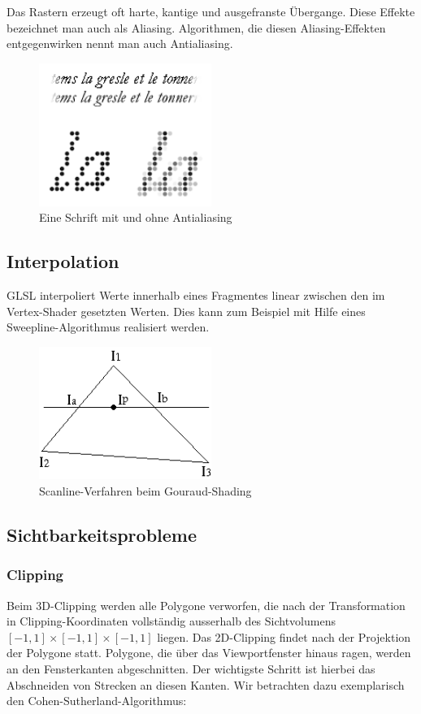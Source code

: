 Das Rastern erzeugt oft harte, kantige und ausgefranste Übergange. Diese Effekte bezeichnet man auch als Aliasing. Algorithmen, die diesen Aliasing-Effekten entgegenwirken nennt man auch Antialiasing. 
\begin{figure}[H]
    \centering
    \includegraphics[width=0.5\textwidth]{images/Antialiasing.png}
    \caption{Eine Schrift mit und ohne Antialiasing}
    \label{fig:screening-antialiasing-font}
\end{figure}

\subsection*{Interpolation}
GLSL interpoliert Werte innerhalb eines Fragmentes linear zwischen den im Vertex-Shader gesetzten Werten.
Dies kann  zum Beispiel mit Hilfe eines Sweepline-Algorithmus realisiert werden.
\begin{figure}[H]
    \centering
    \includegraphics[width=0.5\textwidth]{images/gouraud_scanline.png}
    \caption{Scanline-Verfahren beim Gouraud-Shading}
    \label{fig:gouraud-shading-scanline}
\end{figure}


\subsection*{Sichtbarkeitsprobleme}

\subsubsection*{Clipping}
Beim 3D-Clipping werden alle Polygone verworfen, die nach der Transformation in Clipping-Koordinaten vollständig ausserhalb des Sichtvolumens
$[-1,1] \times [-1,1] \times [-1,1] $ liegen. Das 2D-Clipping findet nach der Projektion der Polygone statt. Polygone, die über das Viewportfenster hinaus ragen, werden an den Fensterkanten abgeschnitten.
Der wichtigste Schritt ist hierbei das Abschneiden von Strecken an diesen Kanten. Wir betrachten dazu exemplarisch den Cohen-Sutherland-Algorithmus:

